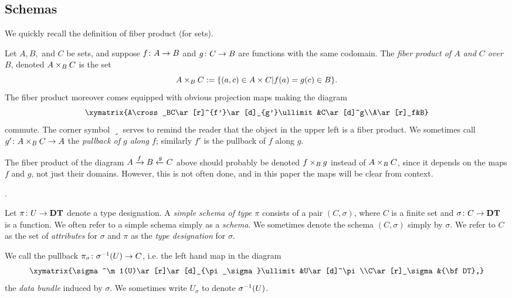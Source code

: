 \documentclass{amsart}
\def\DT{{\bf DT}}
\def\C{\check{\tn{C}}}
\begin{document}
\subsection{Schemas}

We quickly recall the definition of fiber product (for sets).

\begin{definition}

Let $A, B,$ and $C$ be sets, and suppose $f\colon A\rightarrow B$ and $g\colon C\rightarrow B$ are functions with the same codomain.  The {\em fiber product of $A$ and $C$ over $B$}, denoted $A\times_BC$ is the set $$A\times_BC:=\{(a,c)\in A\times C | f(a)=g(c)\in B\}.$$  The fiber product moreover comes equipped with obvious projection maps making the diagram $$\xymatrix{A\cross_BC\ar[r]^{f'}\ar[d]_{g'}\ullimit&C\ar[d]^g\\A\ar[r]_f&B}$$ commute.  The corner symbol $\lrcorner$ serves to remind the reader that the object in the upper left is a fiber product.   We sometimes call $g'\colon A\times_BC\rightarrow A$ the {\em pullback of $g$ along $f$}; similarly $f'$ is the pullback of $f$ along $g$.

\end{definition}

\begin{remark}

The fiber product of the diagram $A\xrightarrow{f}B\xleftarrow{g}C$ above should probably be denoted $f\times_Bg$ instead of $A\times_BC$, since it depends on the maps $f$ and $g$, not just their domains.  However, this is not often done, and in this paper the maps will be clear from context.

\end{remark}

\begin{definition}\label{def:simple schema}.

Let $\pi\taking U\to\DT$ denote a type designation.  A {\em simple schema of type $\pi$} consists of a pair $(C,\sigma)$, where $C$ is a finite set and $\sigma\taking C\to\DT$ is a function.   We often refer to a simple schema simply as a {\em schema}.  We sometimes denote the schema $(C,\sigma)$ simply by $\sigma$.  We refer to $C$ as the set of {\em attributes} for $\sigma$ and $\pi$ as the {\em type designation} for $\sigma$.

We call the pullback $\pi_\sigma\taking\sigma^\m1(U)\to C$, i.e. the left hand map in the diagram $$\xymatrix{\sigma^\m1(U)\ar[r]\ar[d]_{\pi_\sigma}\ullimit&U\ar[d]^\pi\\C\ar[r]_\sigma&\DT,}$$ the {\em data bundle} induced by $\sigma$.  We sometimes write $U_\sigma$ to denote $\sigma^\m1(U)$.

\end{definition}
\end{document}
